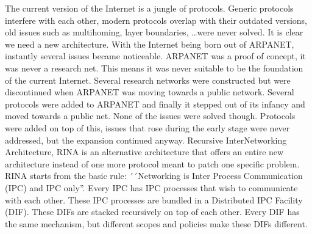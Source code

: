 \begin{slshape}



The current version of the Internet is a jungle of protocols. Generic protocols interfere with each other, modern protocols overlap with their outdated versions, old issues such as multihoming, layer boundaries, \ldots were never solved. It is clear we need a new architecture. 
\npar
With the Internet being born out of ARPANET, instantly several issues became noticeable. ARPANET was a proof of concept, it was never a research net. This means it was never suitable to be the foundation of the current Internet. Several research networks were constructed but were discontinued when ARPANET was moving towards a public network. Several protocols were added to ARPANET and finally it stepped out of its infancy and moved towards a public net. None of the issues were solved though. Protocols were added on top of this, issues that rose during the early stage were never addressed, but the expansion continued anyway. Recursive InterNetworking Architecture, RINA is an alternative architecture that offers an entire new architecture instead of one more protocol meant to patch one specific problem. RINA starts from the basic rule: ´´Networking is Inter Process Communication (IPC) and IPC only''. Every IPC has IPC processes that wish to communicate with each other. These IPC processes are bundled in a Distributed IPC Facility (DIF). These DIFs are stacked recursively on top of each other. Every DIF has the same mechanism, but different scopes and policies make these DIFs different. 

\npar


\end{slshape}
